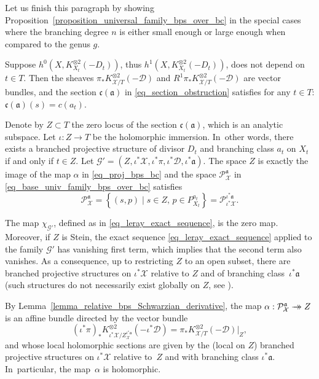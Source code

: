 \documentclass[JEP,XML,SOM,Unicode,NoEqCountersInSection,published]{cedram}
\newcommand{\onto}{\mathchoice{\to\hspace*{-5mm}\to}{\to\hspace*{-2.85mm}\to}{\to\hspace*{-3mm}\to}{\to\hspace*{-3mm}\to}}
\theoremstyle{definition}
\theoremstyle{plain}
\begin{document}
Let us finish this paragraph by showing Proposition~\ref{proposition_universal_family_bps_over_bc} in the special cases where the branching degree $n$ is either small enough or large enough when compared to the genus $g$.

Suppose $h^0\left(X, K_{X_t}^{\otimes 2}(-D_t)\right)$, thus $h^1\left(X, K_{X_t}^{\otimes 2}(-D_t)\right)$, does not depend on $t \in T$.
Then the sheaves $\pi_*K_{\mathcal X/T}^{\otimes 2}(-\mathcal D)$ and $R^1\pi_*K_{\mathcal X/T}^{\otimes 2}(-\mathcal D)$ are vector bundles, and the section $\mathfrak c(\mathfrak a)$ in \eqref{eq_section_obstruction} satisfies for any $t \in T$: $\mathfrak c(\mathfrak a)(s) = c\left(a_t\right)$.

Denote by $Z \subset T$ the zero locus of the section $\mathfrak c(\mathfrak a)$, which is an analytic subspace.
Let $\iota: Z \to T$ be the holomorphic immersion. In~other words, there exists a branched projective structure of divisor $D_t$ and branching class $a_t$ on $X_t$ if and only if $t \in Z$.
Let $\mathcal G' = \left(Z, \iota^* \mathcal X, \iota^* \pi, \iota^* \mathcal D, \iota^* \mathfrak a\right)$.
The space $Z$ is exactly the image of the map $\alpha$ in \eqref{eq_proj_bps_bc} and the space $\mathcal P_{\mathcal X}^{\mathfrak a}$ in \eqref{eq_base_univ_family_bps_over_bc} satisfies\vspace*{-3pt}
\begin{equation*}
\mathcal P_{\mathcal X}^{\mathfrak a} = \left \{(s, p)\mid s \in Z,\, p \in P_{X_t}^{a_t}\right \} = \mathcal P_{\iota^* \mathcal X}^{\iota^* \mathfrak a}.
\end{equation*}

The map $\chi_{\mathcal G'}$, defined as in \eqref{eq_leray_exact_sequence}, is the zero map.
Moreover, if $Z$ is Stein, the exact sequence \eqref{eq_leray_exact_sequence} applied to the family $\mathcal G'$ has vanishing first term, which implies that the second term also vanishes.
As a consequence, up to restricting $Z$ to an open subset, there are branched projective structures on $\iota^* \mathcal X$ relative to $Z$ and of branching class~$\iota^* \mathfrak a$ (such structures do not necessarily exist globally on $Z$, see \cite{DG23}).

By Lemma~\ref{lemma_relative_bps_Schwarzian_derivative}, the map $\alpha: \mathcal P_{\mathcal X}^{\mathfrak a} \onto Z$ is an affine bundle directed by the vector bundle\vspace*{-3pt}
\[
\left( \iota^* \pi\right)_* K_{\iota^*\mathcal X/Z_{\mathcal X}^{\iota^* \mathfrak a}}^{\otimes 2}\left(-\iota^*\mathcal D\right) = \pi_* K_{\mathcal X/T}^{\otimes 2}(-\mathcal D) \big |_Z,
\]
and whose local holomorphic sections are given by the (local on $Z$) branched projective structures on $\iota^* \mathcal X$ relative to~$Z$ and with branching class $\iota^* \mathfrak a$. In~particular, the map~$\alpha$ is holomorphic.
\end{document}
